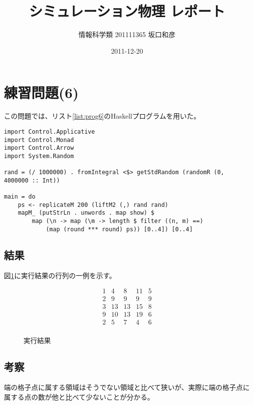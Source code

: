\documentclass{jsarticle}
\title{シミュレーション物理 レポート}
\author{情報科学類 201111365 坂口和彦}
\date{2011-12-20}
\begin{document}
\maketitle

\section{練習問題(6)}

この問題では、リスト\ref{list:prog6}のHaskellプログラムを用いた。

\begin{lstlisting}[style=program, label=list:prog6, caption=練習問題(6)のプログラム]
import Control.Applicative
import Control.Monad
import Control.Arrow
import System.Random

rand = (/ 1000000) . fromIntegral <$> getStdRandom (randomR (0, 4000000 :: Int))

main = do
    ps <- replicateM 200 (liftM2 (,) rand rand)
    mapM_ (putStrLn . unwords . map show) $
        map (\n -> map (\m -> length $ filter ((n, m) ==)
            (map (round *** round) ps)) [0..4]) [0..4]
\end{lstlisting}

\subsection{結果}

図\ref{fig:output}に実行結果の行列の一例を示す。

\begin{figure}[htbp]
  \[
    \begin{matrix}
      1  & 4  & 8  & 11 & 5  \\
      2  & 9  & 9  & 9  & 9  \\
      3  & 13 & 13 & 15 & 8  \\
      9  & 10 & 13 & 19 & 6  \\
      2  & 5  & 7  & 4  & 6  \\
    \end{matrix}
  \]
  \caption{実行結果}
  \label{fig:output}
\end{figure}

\subsection{考察}

端の格子点に属する領域はそうでない領域と比べて狭いが、実際に端の格子点に属する点の数が他と比べて少ないことが分かる。
\end{document}
